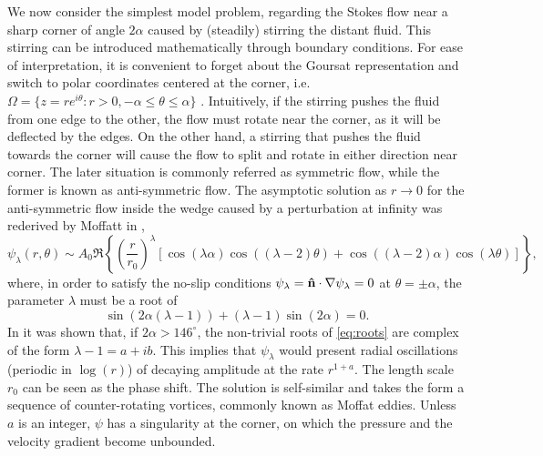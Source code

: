 We now consider the simplest model problem, regarding the Stokes flow near a sharp corner of angle $2\alpha$ caused by (steadily) stirring the distant fluid. This stirring can be introduced mathematically through boundary conditions. For ease of interpretation, it is convenient to forget about the Goursat representation and switch to polar coordinates centered at the corner, i.e. $\Omega = \{z = re^{i\theta} : r > 0, -\alpha \leq \theta \leq \alpha \}$ . Intuitively, if the stirring pushes the fluid from one edge to the other, the flow must rotate near the corner, as it will be deflected by the edges. On the other hand, a stirring that pushes the fluid towards the corner will cause the flow to split and rotate in either direction near corner. The later situation is commonly referred as symmetric flow, while the former is known as anti-symmetric flow. The asymptotic solution as $r\to 0$ for the anti-symmetric flow inside the wedge caused by a perturbation at infinity was rederived by Moffatt in \cite{moffatt64},
\begin{equation}\label{eq:antisym}
\psi_\lambda(r,\theta) \sim A_0\Re\left\{\left(\frac{r}{r_0}\right)^\lambda \left[\cos{(\lambda\alpha)}\cos{\left((\lambda-2)\theta\right)}+\cos{\left((\lambda-2)\alpha\right)}\cos{(\lambda\theta)}\right]\right\},
\end{equation}
where, in order to satisfy the no-slip conditions $\psi_\lambda=\mathbf{\hat{n}}\cdot\nabla\psi_\lambda=0$ at $\theta=\pm\alpha$, the parameter $\lambda$ must be a root of
\begin{equation}\label{eq:roots}
\sin{\left(2\alpha(\lambda-1)\right)} + (\lambda-1)\sin{(2\alpha)}=0.
\end{equation}
In \cite{dean49} it was shown that, if $2\alpha>146^\circ$, the non-trivial roots of \eqref{eq:roots} are complex of the form $\lambda-1=a + ib$. This implies that $\psi_\lambda$ would present radial oscillations (periodic in $\log(r)$) of decaying amplitude at the rate  $r^{1+a}$. The length scale $r_0$ can be seen as  the phase shift. The solution is self-similar and takes the form a sequence of counter-rotating vortices, commonly known as Moffat eddies. Unless $a$ is an integer, $\psi$ has a singularity at the corner, on which the pressure and the velocity gradient become unbounded.


